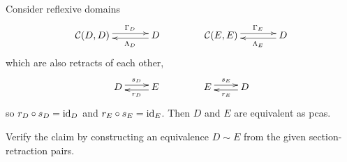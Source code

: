 Consider reflexive domains
%
\begin{equation*}
  \xymatrix{
    **[l]{\mathcal{C}(D, D)}
    \ar@<+0.25em>[r]^{\Gamma_D}
    &
    {D}
    \ar@<+0.25em>[l]^{\Lambda_D}
  }
  \qquad\qquad
  \xymatrix{
    **[l]{\mathcal{C}(E, E)}
    \ar@<+0.25em>[r]^{\Gamma_E}
    &
    {D}
    \ar@<+0.25em>[l]^{\Lambda_E}
  }
\end{equation*}
%
which are also retracts of each other,
%
\begin{equation*}
  \xymatrix{
    {D}
    \ar@<+0.25em>[r]^{s_D}
    &
    {E}
    \ar@<+0.25em>[l]^{r_D}
  }
  \qquad\qquad
  \xymatrix{
    {E}
    \ar@<+0.25em>[r]^{s_E}
    &
    {D}
    \ar@<+0.25em>[l]^{r_E}
  } 
\end{equation*}
%
so $r_D \circ s_D = \id[D]$ and $r_E \circ s_E = \id[E]$. Then $D$ and $E$ are equivalent as pcas.

\begin{exercise}
  Verify the claim by constructing an equivalence $D \sim E$ from the given section-retraction pairs.
\end{exercise}



